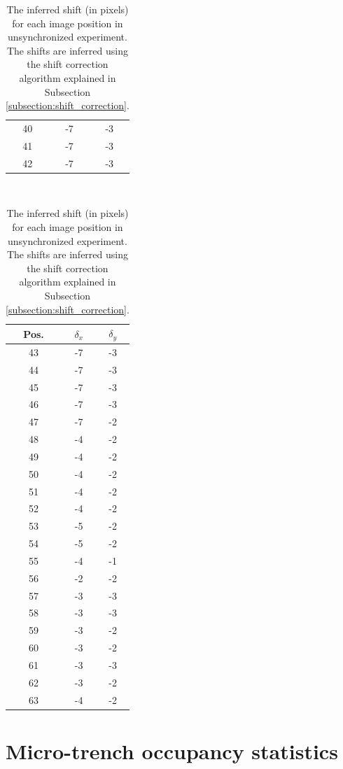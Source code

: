 \documentclass[pdftex,12pt,a4paper]{report}
\begin{document}
\begin{appendices}
\begin{table}[H]
\begin{tabular}[t]{ c | c | c }
\\
40 & -7 & -3
\\
41 & -7 & -3
\\
42 & -7 & -3
\\
\hline
\end{tabular}
~
\begin{tabular}[t]{ c | c | c }
\hline
Pos. & $\delta_x$ & $\delta_y$
\\
\hline\hline
43 & -7 & -3
\\
44 & -7 & -3
\\
45 & -7 & -3
\\
46 & -7 & -3
\\
47 & -7 & -2
\\
48 & -4 & -2
\\
49 & -4 & -2
\\
50 & -4 & -2
\\
51 & -4 & -2
\\
52 & -4 & -2
\\
53 & -5 & -2
\\
54 & -5 & -2
\\
55 & -4 & -1
\\
56 & -2 & -2
\\
57 & -3 & -3
\\
58 & -3 & -3
\\
59 & -3 & -2
\\
60 & -3 & -2
\\
61 & -3 & -3
\\
62 & -3 & -2
\\
63 & -4 & -2
\\
\hline
\end{tabular}
\caption[The inferred shift (in pixels) for each image position in the unsynchronized experiment]{The inferred shift (in pixels) for each image position in unsynchronized experiment. The shifts are inferred using the shift correction algorithm explained in Subsection \ref{subsection:shift_correction}.}
\label{table:inferred_shift}
\end{table}

\section{Micro-trench occupancy statistics}


\end{appendices}
\end{document}
